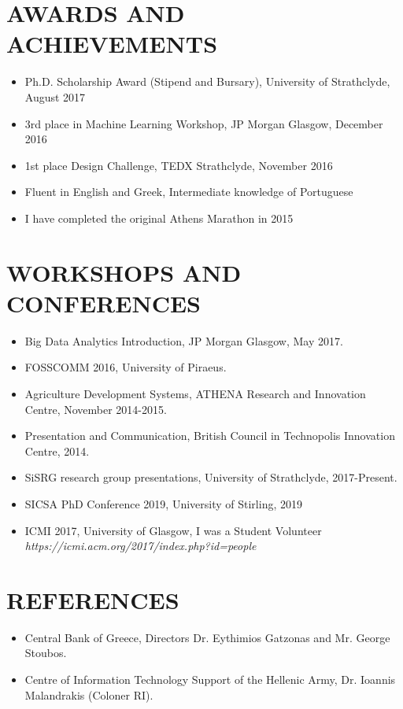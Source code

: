 \documentclass[11pt,a4paper,roman]{moderncv}        %
\begin{document}
{\section{AWARDS AND ACHIEVEMENTS}
\begin{minipage}{\maincolumnwidth}%
	\small{
    	\begin{itemize}
          \item Ph.D. Scholarship Award (Stipend and Bursary), University of Strathclyde, August 2017
          \item 3rd place in Machine Learning Workshop, JP Morgan Glasgow, December 2016
          \item 1st place Design Challenge, TEDX Strathclyde, November 2016
          \item Fluent in English and Greek, Intermediate knowledge of Portuguese
          \item I have completed the original Athens Marathon in 2015 
		\end{itemize}}%
\end{minipage}%


\section{WORKSHOPS AND CONFERENCES}
\begin{minipage}{\maincolumnwidth}%
	\small{
    	\begin{itemize}
          \item Big Data Analytics Introduction, JP Morgan Glasgow, May 2017.
          \item FOSSCOMM 2016, University of Piraeus.
          \item Agriculture Development Systems, ATHENA Research and Innovation Centre, November 2014-2015.
          \item Presentation and Communication, British Council in Technopolis Innovation Centre, 2014.
          \item SiSRG research group presentations, University of Strathclyde, 2017-Present.
          \item SICSA PhD Conference 2019, University of Stirling, 2019
          \item ICMI 2017, University of Glasgow, I was a Student Volunteer \textit{https://icmi.acm.org/2017/index.php?id=people}
		\end{itemize}}%
\end{minipage}%

\section{REFERENCES}
\begin{minipage}{\maincolumnwidth}%
	\small{
    	\begin{itemize}
          \item Central Bank of Greece, Directors Dr. Eythimios Gatzonas and Mr. George Stoubos.
          \item Centre of Information Technology Support of the Hellenic Army, Dr. Ioannis Malandrakis (Coloner RI).
		\end{itemize}}%
\end{minipage}%
      
}
\end{document}

